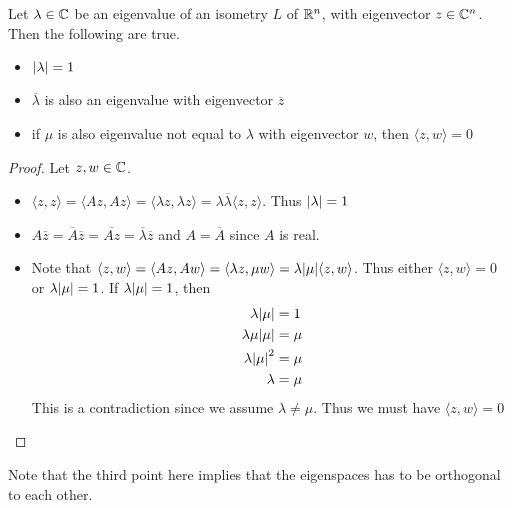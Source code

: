 \documentclass[a4paper]{article}
\begin{document}
\begin{prp}{}{} Let $\lambda\in\mathbb{C}$ be an eigenvalue of an isometry $L$ of $\mathbb{R}^n$, with eigenvector $z\in\mathbb{C}^n$. Then the following are true. 
\begin{itemize}
\item $\abs{\lambda}=1$
\item $\overline{\lambda}$ is also an eigenvalue with eigenvector $\overline{z}$
\item if $\mu$ is also eigenvalue not equal to $\lambda$ with eigenvector $w$, then $\langle z,w\rangle=0$
\end{itemize}\tcbline
\begin{proof} Let $z,w\in\mathbb{C}$. 
\begin{itemize}
\item $\langle z,z\rangle=\langle Az,Az\rangle=\langle\lambda z,\lambda z\rangle=\lambda\overline{\lambda}\langle z,z\rangle$. Thus $\abs{\lambda}=1$
\item $A\overline{z}=\overline{A}\overline{z}=\overline{Az}=\overline{\lambda}\overline{z}$ and $A=\overline{A}$ since $A$ is real. 
\item Note that $\langle z,w\rangle=\langle Az,Aw\rangle=\langle\lambda z,\mu w\rangle=\lambda\abs{\mu}\langle z,w\rangle$. Thus either $\langle z,w\rangle=0$ or $\lambda\abs{\mu}=1$. If $\lambda\abs{\mu}=1$, then
\begin{align*}
\lambda\abs{\mu}&=1\\
\lambda\mu\abs{\mu}&=\mu\\
\lambda\abs{\mu}^2&=\mu\\
\lambda&=\mu
\end{align*}
This is a contradiction since we assume $\lambda\neq\mu$. Thus we must have $\langle z,w\rangle=0$
\end{itemize}
\end{proof}
\end{prp}

Note that the third point here implies that the eigenspaces has to be orthogonal to each other. 
\end{document}
